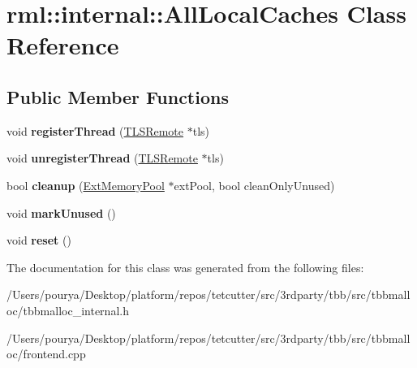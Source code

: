 \hypertarget{classrml_1_1internal_1_1AllLocalCaches}{}\section{rml\+:\+:internal\+:\+:All\+Local\+Caches Class Reference}
\label{classrml_1_1internal_1_1AllLocalCaches}
\subsection*{Public Member Functions}
\begin{DoxyCompactItemize}
\item 
\hypertarget{classrml_1_1internal_1_1AllLocalCaches_ad7176ca94d2801b0d12f1d487a05c6aa}{}void {\bfseries register\+Thread} (\hyperlink{structrml_1_1internal_1_1TLSRemote}{T\+L\+S\+Remote} $\ast$tls)\label{classrml_1_1internal_1_1AllLocalCaches_ad7176ca94d2801b0d12f1d487a05c6aa}

\item 
\hypertarget{classrml_1_1internal_1_1AllLocalCaches_a53d07e07b151b79af310ff5d40010f1d}{}void {\bfseries unregister\+Thread} (\hyperlink{structrml_1_1internal_1_1TLSRemote}{T\+L\+S\+Remote} $\ast$tls)\label{classrml_1_1internal_1_1AllLocalCaches_a53d07e07b151b79af310ff5d40010f1d}

\item 
\hypertarget{classrml_1_1internal_1_1AllLocalCaches_aedb57405e1ee61bc138ed20f05b4ddd9}{}bool {\bfseries cleanup} (\hyperlink{structrml_1_1internal_1_1ExtMemoryPool}{Ext\+Memory\+Pool} $\ast$ext\+Pool, bool clean\+Only\+Unused)\label{classrml_1_1internal_1_1AllLocalCaches_aedb57405e1ee61bc138ed20f05b4ddd9}

\item 
\hypertarget{classrml_1_1internal_1_1AllLocalCaches_ae7e8856f91b8ff05b3ae0a719c20f345}{}void {\bfseries mark\+Unused} ()\label{classrml_1_1internal_1_1AllLocalCaches_ae7e8856f91b8ff05b3ae0a719c20f345}

\item 
\hypertarget{classrml_1_1internal_1_1AllLocalCaches_a3714379b090eb844a02f4f370167077c}{}void {\bfseries reset} ()\label{classrml_1_1internal_1_1AllLocalCaches_a3714379b090eb844a02f4f370167077c}

\end{DoxyCompactItemize}


The documentation for this class was generated from the following files\+:\begin{DoxyCompactItemize}
\item 
/\+Users/pourya/\+Desktop/platform/repos/tetcutter/src/3rdparty/tbb/src/tbbmalloc/tbbmalloc\+\_\+internal.\+h\item 
/\+Users/pourya/\+Desktop/platform/repos/tetcutter/src/3rdparty/tbb/src/tbbmalloc/frontend.\+cpp\end{DoxyCompactItemize}
